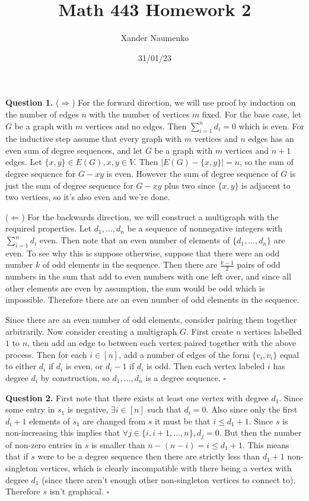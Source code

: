 \documentclass[letterpaper, reqno,11pt]{article}
\begin{document}
\title{Math 443 Homework 2}
\date{31/01/23}
\author{Xander Naumenko}
\maketitle

{\medskip\noindent\bf Question 1.} ($\Rightarrow$) For the forward direction, we will use proof by induction on the number of edges $n$ with the number of vertices $m$ fixed. For the base case, let $G$ be a graph with $m$ vertices and no edges. Then $\sum_{i=1}^{n}d_i=0$ which is even. For the inductive step assume that every graph with $m$ vertices and $n$ edges has an even sum of degree sequences, and let $G$ be a graph with $m$ vertices and $n+1$ edges. Let $\{x,y\}\in E(G), x,y\in V$. Then $|E(G)-\{x,y\}|=n$, so the sum of degree sequence for $G-xy$ is even. However the sum of degree sequence of $G$ is just the sum of degree sequence for $G-xy $ plus two since $\{x,y\} $ is adjacent to two vertices, so it's also even and we're done. 

($\Leftarrow$) For the backwards direction, we will construct a multigraph with the required properties. Let $d_1,\ldots,d_n$ be a sequence of nonnegative integers with $\sum_{i=1}^{n}d_i$ even. Then note that an even number of elements of $\{d_1,\ldots,d_n\}$ are even. To see why this is suppose otherwise, suppose that there were an odd number $k$ of odd elements in the sequence. Then there are $\frac{k-1}{2}$ pairs of odd numbers in the sum that add to even numbers with one left over, and since all other elements are even by assumption, the sum would be odd which is impossible. Therefore there are an even number of odd elements in the sequence. 

Since there are an even number of odd elements, consider pairing them together arbitrarily. Now consider creating a multigraph $G$. First create $n$ vertices labelled $1$ to $n$, then add an edge to between each vertex paired together with the above process. Then for each $i\in[n]$, add a number of edges of the form $\{v_i,v_i\} $ equal to either $d_i$ if $d_i$ is even, or $d_i-1$ if $d_i$ is odd. Then each vertex labeled $i$ has degree $d_i$ by construction, so $d_1,\ldots,d_n$ is a degree sequence. $\square$

{\medskip\noindent\bf Question 2.} First note that there exists at least one vertex with degree $d_1$. Since some entry in $s_1$ is negative, $\exists i\in [n]$ such that $d_i=0$. Also since only the first $d_i+1$ elements of $s_1$ are changed from $s$ it must be that $i\leq d_1+1$. Since $s$ is non-increasing this implies that $\forall j\in \{i, i+1,\ldots, n\}, d_j=0$. But then the number of non-zero entries in $s$ is smaller than $n-(n-i)=i\leq d_1+1$. This means that if $s$ were to be a degree sequence then there are strictly less than $d_1+1$ non-singleton vertices, which is clearly incompatible with there being a vertex with degree $d_1$ (since there aren't enough other non-singleton vertices to connect to). Therefore $s$ isn't graphical. $\square$
\end{document}
